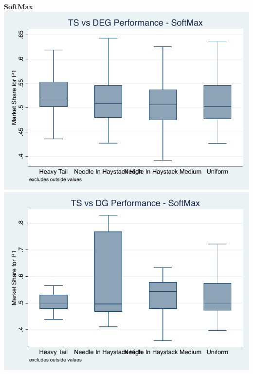 \documentclass[11pt,letterpaper]{article}
\begin{document}
\pagebreak
\textbf{SoftMax} \\
\includegraphics[scale=1]{sm_ts_deg_prior} \\
\includegraphics[scale=1]{sm_ts_dg_prior}
\end{document}
